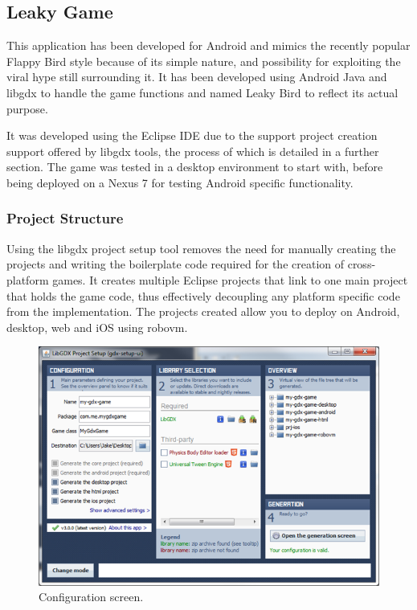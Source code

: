 \newpage
\subsection{Leaky Game}
This application has been developed for Android and mimics the recently popular Flappy Bird style because of its simple nature, and possibility for exploiting the viral hype still surrounding it. It has been developed using Android Java and libgdx to handle the game functions and named Leaky Bird to reflect its actual purpose.

It was developed using the Eclipse IDE due to the support project creation support offered by libgdx tools, the process of which is detailed in a further section. The game was tested in a desktop environment to start with, before being deployed on a Nexus 7 for testing Android specific functionality.

\subsubsection{Project Structure}
Using the libgdx project setup tool removes the need for manually creating the projects and writing the boilerplate code required for the creation of cross-platform games. It creates multiple Eclipse projects that link to one main project that holds the game code, thus effectively decoupling any platform specific code from the implementation. The projects created allow you to deploy on Android, desktop, web and iOS using robovm.

\begin{figure}[h!]
\centering\includegraphics[width=\linewidth]{implementation/figures/gdx-setup-2.png}
\caption{Configuration screen.}
\end{figure}

